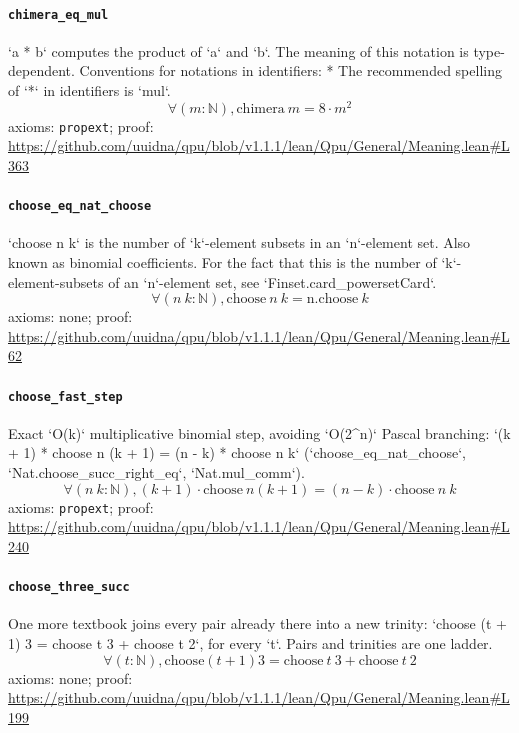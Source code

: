 \documentclass[11pt]{article}
\begin{document}
\paragraph{\texttt{chimera\_eq\_mul}}
`a * b` computes the product of `a` and `b`. The meaning of this notation is type-dependent.   Conventions for notations in identifiers:   * The recommended spelling of `*` in identifiers is `mul`.
\[ \forall (m : \mathbb{N}), \mathrm{chimera}\ m = 8 \cdot m ^{2} \]
\noindent axioms: \texttt{propext}; proof: \url{https://github.com/uuidna/qpu/blob/v1.1.1/lean/Qpu/General/Meaning.lean\#L363}

\paragraph{\texttt{choose\_eq\_nat\_choose}}
`choose n k` is the number of `k`-element subsets in an `n`-element set. Also known as binomial coefficients. For the fact that this is the number of `k`-element-subsets of an `n`-element set, see `Finset.card\_powersetCard`.
\[ \forall (n\ k : \mathbb{N}), \mathrm{choose}\ n\ k = \mathrm{n.choose}\ k \]
\noindent axioms: none; proof: \url{https://github.com/uuidna/qpu/blob/v1.1.1/lean/Qpu/General/Meaning.lean\#L62}

\paragraph{\texttt{choose\_fast\_step}}
Exact `O(k)` multiplicative binomial step, avoiding `O(2\^{}n)` Pascal branching: `(k + 1) * choose n (k + 1) = (n - k) * choose n k` (`choose\_eq\_nat\_choose`, `Nat.choose\_succ\_right\_eq`, `Nat.mul\_comm`).
\[ \forall (n\ k : \mathbb{N}), (k + 1) \cdot \mathrm{choose}\ n (k + 1) = (n - k) \cdot \mathrm{choose}\ n\ k \]
\noindent axioms: \texttt{propext}; proof: \url{https://github.com/uuidna/qpu/blob/v1.1.1/lean/Qpu/General/Meaning.lean\#L240}

\paragraph{\texttt{choose\_three\_succ}}
One more textbook joins every pair already there into a new trinity: `choose (t + 1) 3 = choose t 3 + choose t 2`, for every `t`. Pairs and trinities are one ladder.
\[ \forall (t : \mathbb{N}), \mathrm{choose} (t + 1) 3 = \mathrm{choose}\ t\ 3 + \mathrm{choose}\ t\ 2 \]
\noindent axioms: none; proof: \url{https://github.com/uuidna/qpu/blob/v1.1.1/lean/Qpu/General/Meaning.lean\#L199}
\end{document}
